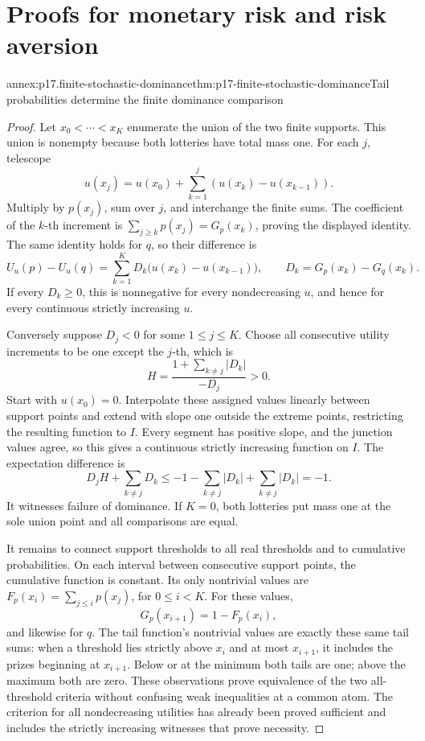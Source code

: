 \section{Proofs for monetary risk and risk aversion}
\label{sec:annex-p17-risk-aversion}

\begin{annexitem}{annex:p17.finite-stochastic-dominance}{thm:p17-finite-stochastic-dominance}{Tail probabilities determine the finite dominance comparison}
\begin{proof}
Let \(x_0<\cdots<x_K\) enumerate the union of the two finite supports.
This union is nonempty because both lotteries have total mass one.
For each \(j\), telescope
\[
                  u(x_j)=u(x_0)+\sum_{k=1}^j
                                      (u(x_k)-u(x_{k-1})).
\]
Multiply by \(p(x_j)\), sum over \(j\), and interchange the finite
sums. The coefficient of the \(k\)-th increment is
\(\sum_{j\geq k}p(x_j)=G_p(x_k)\), proving the displayed identity.
The same identity holds for \(q\), so their difference is
\[
 U_u(p)-U_u(q)=\sum_{k=1}^K D_k\bigl(u(x_k)-u(x_{k-1})\bigr),
 \qquad D_k=G_p(x_k)-G_q(x_k).
\]
If every \(D_k\geq0\), this is nonnegative for every nondecreasing
\(u\), and hence for every continuous strictly increasing \(u\).

Conversely suppose \(D_j<0\) for some \(1\leq j\leq K\).
Choose all consecutive utility increments to be one except the
\(j\)-th, which is
\[
                       H=\frac{1+\sum_{k\ne j}|D_k|}{-D_j}>0.
\]
Start with \(u(x_0)=0\). Interpolate these assigned values linearly
between support points and extend with slope one outside the extreme
points, restricting the resulting function to \(I\). Every segment
has positive slope, and the junction values agree, so this gives a
continuous strictly increasing function on \(I\). The expectation
difference is
\[
                D_jH+\sum_{k\ne j}D_k
                  \leq-1-\sum_{k\ne j}|D_k|+\sum_{k\ne j}|D_k|=-1.
\]
It witnesses failure of dominance. If \(K=0\), both lotteries put
mass one at the sole union point and all comparisons are equal.

It remains to connect support thresholds to all real thresholds and
to cumulative probabilities. On each interval between consecutive
support points, the cumulative function is constant. Its only
nontrivial values are
\(F_p(x_i)=\sum_{j\leq i}p(x_j)\), for \(0\leq i<K\).
For these values,
\[
                         G_p(x_{i+1})=1-F_p(x_i),
\]
and likewise for \(q\). The tail function's nontrivial values are
exactly these same tail sums: when a threshold lies strictly above
\(x_i\) and at most \(x_{i+1}\), it includes the prizes beginning
at \(x_{i+1}\). Below or at the minimum both tails are one; above
the maximum both are zero. These observations prove equivalence of
the two all-threshold criteria without confusing weak inequalities
at a common atom. The criterion for all nondecreasing utilities has
already been proved sufficient and includes the strictly increasing
witnesses that prove necessity.
\end{proof}
\end{annexitem}

